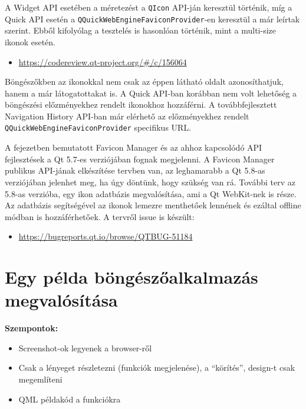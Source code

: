 \documentclass[12pt]{report}
\let\origurl\url
\renewcommand{\url}[1]{%
    \textcolor{blue}{\origurl{#1}}
}
\newcommand{\gerrit}[1]{%
    \textcolor{qtgreen}{\origurl{https://codereview.qt-project.org/\#/c/#1}}
}
\newcommand{\qtbug}[1]{%
    \textcolor{qtred}{\origurl{https://bugreports.qt.io/browse/QTBUG-#1}}
}
\begin{document}
A Widget API esetében a méretezést a \texttt{QIcon} API-ján keresztül történik, míg a
Quick API esetén a \texttt{QQuickWebEngineFaviconProvider}-en keresztül a már leírtak
szerint. Ebből kifolyólag a tesztelés is hasonlóan történik, mint a multi-size ikonok
esetén.

\begin{center}
    \begin{reviewbox}
        \begin{itemize}
            \renewcommand{\labelitemi}{\textcolor{qtgreen}{$\blacktriangleright$}}
            \item \gerrit{156064}
        \end{itemize}
    \end{reviewbox}
\end{center}

Böngészőkben az ikonokkal nem csak az éppen látható oldalt azonosíthatjuk, hanem a már
látogatottakat is. A Quick API-ban korábban nem volt lehetőség a böngészési előzményekhez
rendelt ikonokhoz hozzáférni. A továbbfejlesztett Navigation History API-ban már elérhető
az előzményekhez rendelt \texttt{QQuickWebEngineFaviconProvider} specifikus URL.

A fejezetben bemutatott Favicon Manager és az ahhoz kapcsolódó API fejlesztések a Qt 5.7-es
verziójában fognak megjelenni. A Favicon Manager publikus API-jának elkészítése tervben van,
az leghamarabb a Qt 5.8-as verziójában jelenhet meg, ha úgy döntünk, hogy szükség van rá.
További terv az 5.8-as verzióba, egy ikon adatbázis megvalósítása, ami a Qt WebKit-nek is
része. Az adatbázis segítségével az ikonok lemezre menthetőek lennének és ezáltal offline
módban is hozzáférhetőek. A tervről issue is készült:
\begin{center}
    \begin{issuebox}
        \begin{itemize}
            \renewcommand{\labelitemi}{\textcolor{qtred}{$\blacktriangleright$}}
            \item \qtbug{51184}
        \end{itemize}
    \end{issuebox}
\end{center}


\chapter{Egy példa böngészőalkalmazás megvalósítása}
\textbf{Szempontok:}
\begin{itemize}
    \item Screenshot-ok legyenek a browser-ről
    \item Csak a lényeget részletezni (funkciók megjelenése), a ``körítés'', design-t csak
        megemlíteni
    \item QML példakód a funkciókra
\end{itemize}
\end{document}
